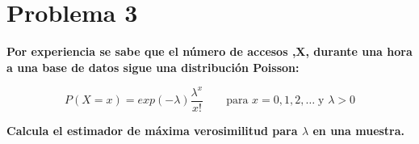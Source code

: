 \section*{Problema 3}

\textbf{Por experiencia se sabe que el número de  accesos ,X, durante una hora a una base de datos sigue una distribución Poisson:}

\begin{equation*}
	P(X=x) = exp(-\lambda) \frac{\lambda^x}{x!} \qquad \text{para } x=0,1,2,\dots \; \text{y } \lambda>0
\end{equation*}

\textbf{Calcula el estimador de máxima verosimilitud para $\lambda$ en una muestra.}
